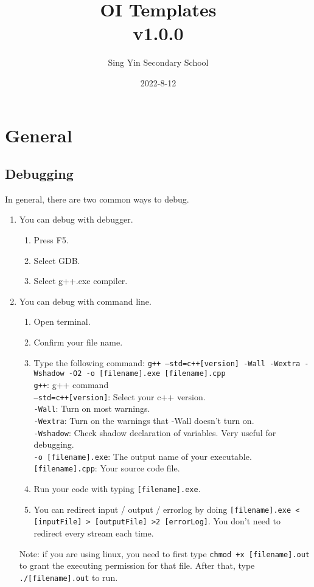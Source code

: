 \documentclass{article}
\title{%
    OI Templates \\
    \large v1.0.0}
\author{Sing Yin Secondary School}
\date{2022-8-12}
\begin{document}
\maketitle

\tableofcontents
\pagebreak

\section{General}
\subsection{Debugging}
In general, there are two common ways to debug.

\begin{enumerate}
    \item You can debug with debugger.
    \begin{enumerate}
        \item Press F5.
        \item Select GDB.
        \item Select g++.exe compiler.
    \end{enumerate}
    \item You can debug with command line.
    \begin{enumerate}
        \item Open terminal.
        \item Confirm your file name.
        \item Type the following command: \texttt{g++ --std=c++[version] -Wall -Wextra -Wshadow -O2 -o [filename].exe [filename].cpp} \\
        \texttt{g++}: g++ command \\
        \texttt{--std=c++[version]}: Select your c++ version. \\
        \texttt{-Wall}: Turn on most warnings. \\
        \texttt{-Wextra}: Turn on the warnings that -Wall doesn't turn on. \\
        \texttt{-Wshadow}: Check shadow declaration of variables. Very useful for debugging. \\
        \texttt{-o [filename].exe}: The output name of your executable. \\
        \texttt{[filename].cpp}: Your source code file. \\
        \item Run your code with typing \texttt{[filename].exe}.\\
        \item You can redirect input / output / errorlog by doing \texttt{[filename].exe < [inputFile] > [outputFile] >2 [errorLog]}. You don't need to redirect every stream each time.
    \end{enumerate}
    Note: if you are using linux, you need to first type \texttt{chmod +x [filename].out}
    to grant the executing permission for that file. After that, type \texttt{./[filename].out} to run.
\end{enumerate}
\end{document}
